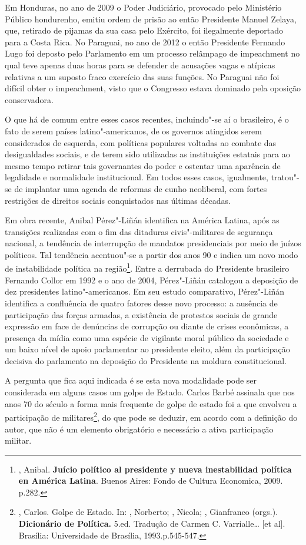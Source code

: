 Em Honduras, no ano de 2009 o Poder Judiciário, provocado pelo
Ministério Público hondurenho, emitiu ordem de prisão ao então
Presidente Manuel Zelaya, que, retirado de pijamas da sua casa pelo
Exército, foi ilegalmente deportado para a Costa Rica. No Paraguai, no
ano de 2012 o então Presidente Fernando Lugo foi deposto pelo Parlamento
em um processo relâmpago de impeachment no qual teve apenas duas horas
para se defender de acusações vagas e atípicas relativas a um suposto
fraco exercício das suas funções. No Paraguai não foi difícil obter o
impeachment, visto que o Congresso estava dominado pela oposição
conservadora.

O que há de comum entre esses casos recentes, incluindo"-se aí o
brasileiro, é o fato de serem países latino"-americanos, de os governos
atingidos serem considerados de esquerda, com políticas populares
voltadas ao combate das desigualdades sociais, e de terem sido
utilizadas as instituições estatais para ao mesmo tempo retirar tais
governantes do poder e ostentar uma aparência de legalidade e
normalidade institucional. Em todos esses casos, igualmente, tratou"-se
de implantar uma agenda de reformas de cunho neoliberal, com fortes
restrições de direitos sociais conquistados nas últimas décadas.

Em obra recente, Anibal Pérez"-Liñán identifica na América Latina, após
as transições realizadas com o fim das ditaduras civis"-militares de
segurança nacional, a tendência de interrupção de mandatos presidenciais
por meio de juízos políticos. Tal tendência acentuou"-se a partir dos
anos 90 e indica um novo modo de instabilidade política na
região\footnote{, Anibal. \textbf{Juício político al
  presidente y nueva inestabilidad política en América Latina}. Buenos
  Aires: Fondo de Cultura Economica, 2009. p.282.}. Entre a derrubada do
Presidente brasileiro Fernando Collor em 1992 e o ano de 2004,
Pérez"-Liñán catalogou a deposição de dez presidentes latino"-americanos.
Em seu estudo comparativo, Pérez"-Liñán identifica a confluência de
quatro fatores desse novo processo: a ausência de participação das
forças armadas, a existência de protestos sociais de grande expressão em
face de denúncias de corrupção ou diante de crises econômicas, a
presença da mídia como uma espécie de vigilante moral público da
sociedade e um baixo nível de apoio parlamentar ao presidente eleito,
além da participação decisiva do parlamento na deposição do Presidente
na moldura constitucional.

A pergunta que fica aqui indicada é se esta nova modalidade pode ser
considerada em alguns casos um golpe de Estado. Carlos Barbé assinala
que nos anos 70 do século  a forma mais frequente de golpe de estado
foi a que envolveu a participação de militares\footnote{, Carlos.
  Golpe de Estado. In: , Norberto; , Nicola; ,
  Gianfranco (orgs.). \textbf{Dicionário de Política.} 5.ed. Tradução de
  Carmen C. Varrialle\ldots{} {[}et al{]}. Brasília: Universidade de
  Brasília, 1993.p.545-547.}, do que pode se deduzir, em acordo com a
definição do autor, que não é um elemento obrigatório e necessário a
ativa participação militar.

